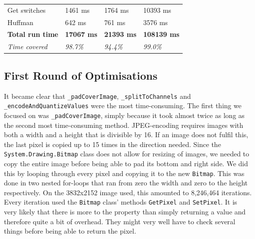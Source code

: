 \begin{table}[H]
\begin{tabular}{@{}llll@{}}
        Get switches            & 1461 ms                                                                                   & 1764 ms                                                                                    & 10393 ms                                                                                \\
        Huffman                 & 642 ms                                                                                    & 761 ms                                                                                     & 3576 ms                                                                                 \\ \midrule
        \textbf{Total run time} & \textbf{17067 ms}                                                                         & \textbf{21393 ms}                                                                          & \textbf{108139 ms}                                                                      \\
        \textit{Time covered}   & \textit{98.7\%}                                                                           & \textit{94.4\%}                                                                            & \textit{99.0\%}                                                                         \\ \bottomrule
    \end{tabular}
\end{table}

\subsection{First Round of Optimisations}
It became clear that \lstinline|_padCoverImage|, \lstinline|_splitToChannels| and \lstinline|_encodeAndQuantizeValues| were the most time-consuming.
The first thing we focused on was \lstinline|_padCoverImage|, simply because it took almost twice as long as the second most time-consuming method.
JPEG-encoding requires images with both a width and a height that is divisible by 16.
If an image does not fulfil this, the last pixel is copied up to 15 times in the direction needed.
Since the \lstinline|System.Drawing.Bitmap| class does not allow for resizing of images, we needed to copy the entire image before being able to pad its bottom and right side.
We did this by looping through every pixel and copying it to the new \lstinline|Bitmap|.
This was done in two nested for-loops that ran from zero the width and zero to the height respectively.
On the 3832x2152 image used, this amounted to 8,246,464 iterations.
Every iteration used the \lstinline|Bitmap| class' methods \lstinline|GetPixel| and \lstinline|SetPixel|.
It is very likely that there is more to the property than simply returning a value and therefore quite a bit of overhead. They might very well have to check several things before being able to return the pixel.

